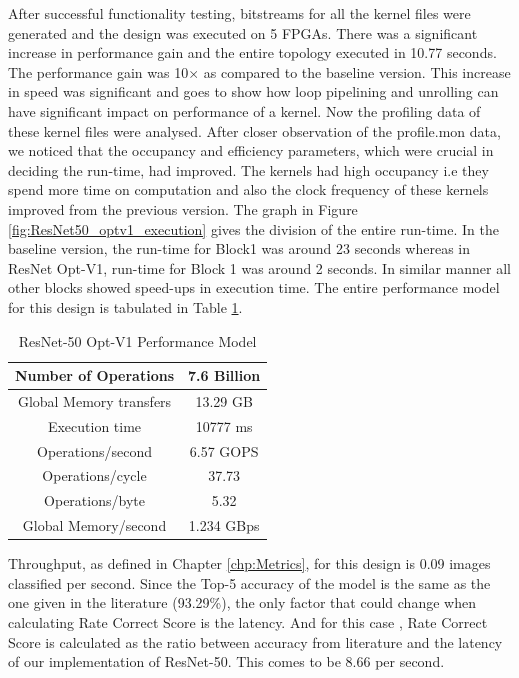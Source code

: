 After successful functionality testing, bitstreams for all the kernel files were generated and the design was executed on 5 FPGAs. There was a significant increase in performance gain and the entire topology executed in 10.77 seconds. The performance gain was 10$\times$ as compared to the baseline version. This increase in speed was significant and goes to show how loop pipelining and unrolling can have significant impact on performance of a kernel.
\newline
Now the profiling data of these kernel files were analysed. After closer observation of the profile.mon data, we noticed that the occupancy and efficiency parameters, which were crucial in deciding the run-time, had improved. The kernels had high occupancy i.e they spend more time on computation and also the clock frequency of these kernels improved from the previous version. The graph in Figure \ref{fig:ResNet50_optv1_execution} gives the division of the entire run-time. In the baseline version, the run-time for Block1 was around 23 seconds whereas in ResNet Opt-V1, run-time for Block 1 was around 2 seconds. In similar manner all other blocks showed speed-ups in execution time. The entire performance model for this design is tabulated in Table \ref{tab:ResNet50OptV1PerformanceModel}.  

\begin{table}[!htb]
\centering
\captionsetup{
justification = centering
}
\caption{ResNet-50 Opt-V1 Performance Model}
\label{tab:ResNet50OptV1PerformanceModel}
\begin{tabular}{|c|c|}
\hline
Number of Operations     & 7.6 Billion \\ \hline
Global Memory transfers & 13.29 GB    \\ \hline
Execution time             & 10777 ms    \\ \hline
Operations/second    & 6.57 GOPS   \\ \hline
Operations/cycle     & 37.73       \\ \hline
Operations/byte      & 5.32        \\ \hline
Global Memory/second    & 1.234 GBps  \\ \hline
\end{tabular}
\end{table}


Throughput, as defined in Chapter \ref{chp:Metrics}, for this design is 0.09 images classified per second. Since  the Top-5 accuracy of the model is the same as the one given in the literature (93.29\%), the only factor that could change when calculating Rate Correct Score is the latency. And for this case , Rate Correct Score is calculated as the ratio between accuracy from literature and the latency of our implementation of ResNet-50. This comes to be  8.66 per second.  


